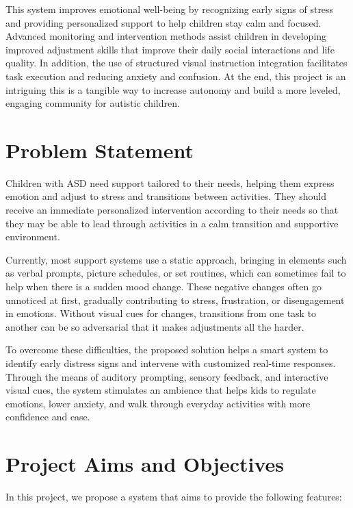 \documentclass[a4paper,12pt]{report}
\begin{document}
This system improves emotional well-being by recognizing early signs of stress and providing personalized support to help children stay calm and focused. Advanced monitoring and intervention methods assist children in developing improved adjustment skills that improve their daily social interactions and life quality. In addition, the use of structured visual instruction integration facilitates task execution and reducing anxiety and confusion. At the end, this project is an intriguing this is a tangible way to increase autonomy and build a more leveled, engaging community for autistic children.


\section{Problem Statement}

Children with ASD need support tailored to their needs, helping them express emotion and adjust to stress and transitions between activities. They should receive an immediate personalized intervention according to their needs so that they may be able to lead through activities in a calm transition and supportive environment.

Currently, most support systems use a static approach, bringing in elements such as verbal prompts, picture schedules, or set routines, which can sometimes fail to help when there is a sudden mood change. These negative changes often go unnoticed at first, gradually contributing to stress, frustration, or disengagement in emotions. Without visual cues for changes, transitions from one task to another can be so adversarial that it makes adjustments all the harder.

To overcome these difficulties, the proposed solution helps a smart system to identify early distress signs and intervene with customized real-time responses. Through the means of auditory prompting, sensory feedback, and interactive visual cues, the system stimulates an ambience that helps kids to regulate emotions, lower anxiety, and walk through everyday activities with more confidence and ease.



\section{Project Aims and Objectives}

In this project, we propose a system that aims to provide the following features:
\end{document}
